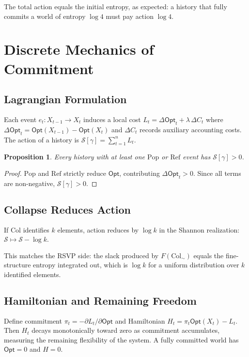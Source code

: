 \documentclass[12pt,a4paper]{article}
\newtheorem{proposition}[theorem]{Proposition}
\theoremstyle{definition}
\theoremstyle{remark}
\newcommand{\Opt}{\ensuremath{\mathsf{Opt}}}
\newcommand{\Pop}{\ensuremath{\mathrm{Pop}}}
\newcommand{\RefOp}{\ensuremath{\mathrm{Ref}}}
\newcommand{\Col}{\ensuremath{\mathrm{Col}}}
\begin{document}
The total action equals the initial entropy, as expected: a history that fully commits
a world of entropy $\log 4$ must pay action $\log 4$.

\section{Discrete Mechanics of Commitment}
\label{sec:mechanics}

\subsection{Lagrangian Formulation}

Each event $e_t:X_{t-1}\to X_t$ induces a local cost
$L_t=\Delta\Opt_t+\lambda\,\Delta C_t$ where
$\Delta\Opt_t=\Opt(X_{t-1})-\Opt(X_t)$ and $\Delta C_t$ records auxiliary
accounting costs. The action of a history is
$\mathcal{S}[\gamma]=\sum_{t=1}^n L_t.$

\begin{proposition}
Every history with at least one $\Pop$ or $\RefOp$ event has $\mathcal{S}[\gamma]>0$.
\end{proposition}

\begin{proof}
$\Pop$ and $\RefOp$ strictly reduce $\Opt$, contributing $\Delta\Opt_t>0$. Since all
terms are non-negative, $\mathcal{S}[\gamma]>0$.
\end{proof}

\subsection{Collapse Reduces Action}

If $\Col$ identifies $k$ elements, action reduces by $\log k$ in the Shannon
realization: $\mathcal{S}\mapsto\mathcal{S}-\log k$.

This matches the RSVP side: the slack produced by $F(\Col_\sim)$ equals the
fine-structure entropy integrated out, which is $\log k$ for a uniform distribution
over $k$ identified elements.

\subsection{Hamiltonian and Remaining Freedom}

Define commitment $\pi_t=-\partial L_t/\partial\Opt$ and Hamiltonian
$H_t=\pi_t\Opt(X_t)-L_t$. Then $H_t$ decays monotonically toward zero as commitment
accumulates, measuring the remaining flexibility of the system. A fully committed world
has $\Opt=0$ and $H=0$.
\end{document}
